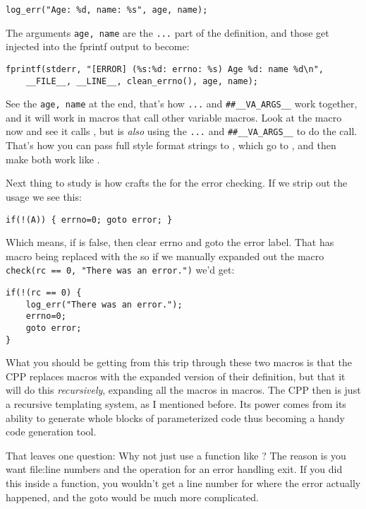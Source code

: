 \verb|log_err("Age: %d, name: %s", age, name);|

The arguments \verb|age, name| are the \verb|...| part of the definition, and those
get injected into the fprintf output to become:

\begin{Verbatim}
fprintf(stderr, "[ERROR] (%s:%d: errno: %s) Age %d: name %d\n",
    __FILE__, __LINE__, clean_errno(), age, name);
\end{Verbatim}

See the \verb|age, name| at the end, that's how \verb|...| and \verb|##__VA_ARGS__|
work together, and it will work in macros that call other variable macros.  Look at
the  macro now and see it calls , but  is
\emph{also} using the \verb|...| and \verb|##__VA_ARGS__| to do the call.  That's
how you can pass full  style format strings to , which 
go to , and then make both work like .

Next thing to study is how  crafts the  for the
error checking.  If we strip out the  usage we see this:

\verb|if(!(A)) { errno=0; goto error; }|

Which means, if  is false, then clear errno and goto the error label.
That has  macro being replaced with the  so if
we manually expanded out the macro \verb|check(rc == 0, "There was an error.")|
we'd get:

\begin{Verbatim}
if(!(rc == 0) {
    log_err("There was an error.");
    errno=0;
    goto error;
}
\end{Verbatim}

What you should be getting from this trip through these two macros is that
the CPP replaces macros with the expanded version of their definition, but
that it will do this \emph{recursively}, expanding all the macros in macros.
The CPP then is just a recursive templating system, as I mentioned before.
Its power comes from its ability to generate whole blocks of parameterized
code thus becoming a handy code generation tool.

That leaves one question:  Why not just use a function like ?
The reason is you want file:line numbers and the  operation
for an error handling exit.  If you did this inside a function, you wouldn't
get a line number for where the error actually happened, and the goto would
be much more complicated.

